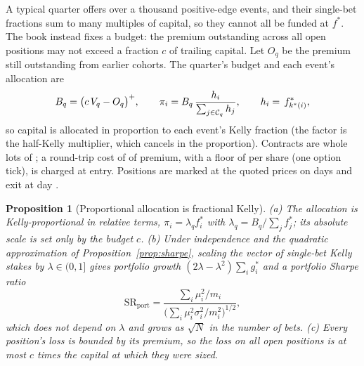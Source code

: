 \documentclass[11pt]{article}
\newtheorem{proposition}{Proposition}
\theoremstyle{definition}
\newcommand{\1}{\mathbf{1}}
\begin{document}
A typical quarter offers over a thousand positive-edge events, and their single-bet fractions sum to many multiples of capital, so they cannot all be funded at $f^\ast$. The book instead fixes a budget: the premium outstanding across
all open positions may not exceed a fraction $c$ of trailing capital. Let $O_q$ be the premium still outstanding from earlier cohorts. The quarter's budget and each event's allocation are
\begin{equation}
  B_q=\big(c\,V_q-O_q\big)^+,\qquad
  \pi_i=B_q\,\frac{h_i}{\sum_{j\in\mathcal C_q}h_j},\qquad h_i=\stv{opt.halfkelly}\,f^\ast_{k^\ast(i)},
  \label{eq:alloc}
\end{equation}
so capital is allocated in proportion to each event's Kelly fraction (the factor  is the half-Kelly multiplier, which cancels in the proportion). Contracts are whole lots of ; a round-trip cost of
 of premium, with a floor of  per share (one option tick), is charged at entry. Positions are marked at the quoted prices on days  and exit at day .

\begin{proposition}[Proportional allocation is fractional Kelly]\label{prop:fractional}
(a) The allocation is Kelly-proportional in relative terms, $\pi_i=\lambda_q f^\ast_i$ with $\lambda_q=B_q/\sum_jf^\ast_j$; its absolute scale is set only by the budget $c$.
(b) Under independence and the quadratic approximation of Proposition~\ref{prop:sharpe}, scaling the vector of single-bet Kelly stakes by $\lambda\in(0,1]$ gives portfolio growth $(2\lambda-\lambda^2)\sum_ig^\ast_i$ and a portfolio Sharpe ratio
\begin{equation}
  \mathrm{SR}_{\text{port}}=\frac{\sum_i\mu_i^2/m_i}{\big(\sum_i\mu_i^2\sigma_i^2/m_i^2\big)^{1/2}},
\end{equation}
which does not depend on $\lambda$ and grows as $\sqrt N$ in the number of bets.
(c) Every position's loss is bounded by its premium, so the loss on all open positions is at most $c$ times the capital at which they were sized.
\end{proposition}
\end{document}
